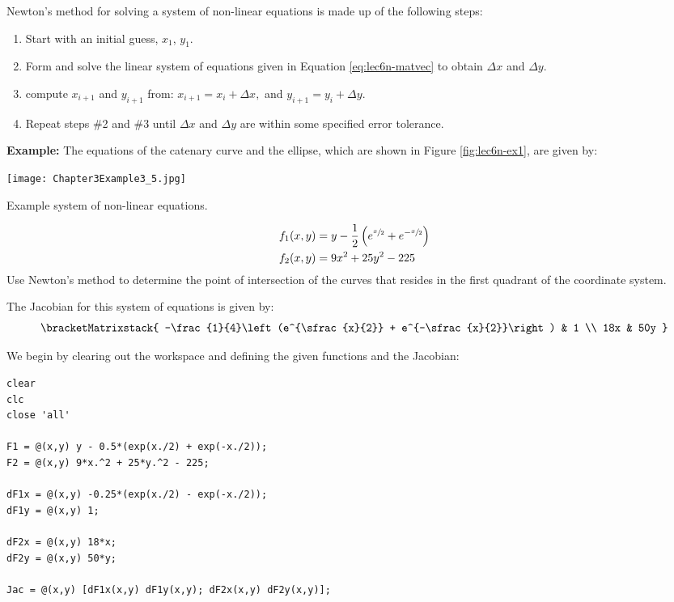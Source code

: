 \vspace{4.0cm}

 Newton's method for solving a system of non-linear equations is made up of the following steps:
\begin{enumerate}
\item Start with an initial guess, $x_1$, $y_1$.
\item Form and solve the linear system of equations given in Equation \ref{eq:lec6n-matvec} to obtain $\Delta x$ and $\Delta y$.
\item compute $x_{i+1}$ and $y_{i+1}$ from: $x_{i+1} = x_{i} + \Delta x, $ and $ y_{i+1} = y_{i} + \Delta y$.
\item Repeat steps \#2 and \#3 until $\Delta x$ and $\Delta y$ are within some specified error tolerance.
\end{enumerate}

\vspace{0.25cm}

\noindent\textbf{Example:} The equations of the catenary curve and the ellipse, which are shown in Figure \ref{fig:lec6n-ex1}, are given by:
\begin{marginfigure}
\texttt{[image: Chapter3Example3\_5.jpg]}
\caption{Example system of non-linear equations.}
\label{fig:lec6n-ex1}
\end{marginfigure}
\begin{align*}
f_1(x,y) &= y-\frac{1}{2}\left(e^{\sfrac{x}{2}} + e^{-\sfrac{x}{2}}\right) \\
f_2(x,y) &= 9x^2 + 25y^2 - 225
\end{align*}
Use Newton's method to determine the point of intersection of the curves that resides in the first quadrant of the coordinate system.

\vspace{0.15cm}

\noindent The Jacobian for this system of equations is given by:
\begin{equation*}
\bracketMatrixstack{
-\frac{1}{4}\left(e^{\sfrac{x}{2}} + e^{-\sfrac{x}{2}}\right) & 1 \\
18x & 50y 
}
\end{equation*}

\vspace{0.15cm}

\noindent We begin by clearing out the workspace and defining the given functions and the Jacobian:
\begin{lstlisting}[style=myMatlab, name=lec6n-ex1]
clear
clc
close 'all'

F1 = @(x,y) y - 0.5*(exp(x./2) + exp(-x./2));
F2 = @(x,y) 9*x.^2 + 25*y.^2 - 225;

dF1x = @(x,y) -0.25*(exp(x./2) - exp(-x./2));
dF1y = @(x,y) 1;

dF2x = @(x,y) 18*x;
dF2y = @(x,y) 50*y;

Jac = @(x,y) [dF1x(x,y) dF1y(x,y); dF2x(x,y) dF2y(x,y)];
\end{lstlisting}

